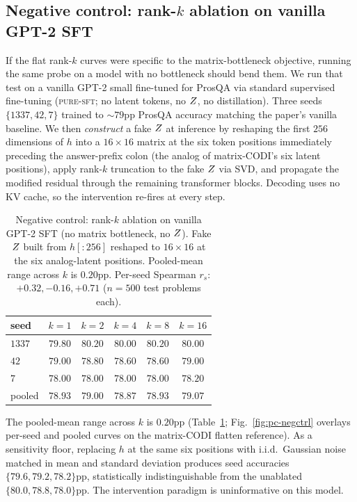 \subsection{Negative control: rank-$k$ ablation on vanilla GPT-2 SFT}
\label{sec:pc-negctrl}

If the flat rank-$k$ curves were specific to the matrix-bottleneck
objective, running the same probe on a model with no bottleneck
should bend them. We run that test on a vanilla GPT-2 small
fine-tuned for ProsQA via standard supervised fine-tuning
(\textsc{pure-sft}; no latent tokens, no $Z$, no distillation).
Three seeds $\{1337, 42, 7\}$ trained to $\sim\!79$pp ProsQA accuracy
matching the paper's vanilla baseline. We then \emph{construct} a
fake $Z$ at inference by reshaping the first $256$ dimensions of
$h$ into a $16\!\times\!16$ matrix at the six token positions
immediately preceding the answer-prefix colon (the analog of
matrix-CODI's six latent positions), apply rank-$k$ truncation to
the fake $Z$ via SVD, and propagate the modified residual through
the remaining transformer blocks. Decoding uses no KV cache, so the
intervention re-fires at every step.

\begin{table}[t]
\caption{Negative control: rank-$k$ ablation on vanilla GPT-2 SFT
(no matrix bottleneck, no $Z$). Fake $Z$ built from
$h[:\!256]$ reshaped to $16\!\times\!16$ at the six analog-latent
positions. Pooled-mean range across $k$ is $0.20$pp. Per-seed
Spearman $r_s$: $+0.32, -0.16, +0.71$ ($n\!=\!500$ test problems
each).}
\label{tab:pc-negctrl}
\centering
\small
\setlength{\tabcolsep}{4pt}
\begin{tabular}{lccccc}
\toprule
seed & $k=1$ & $k=2$ & $k=4$ & $k=8$ & $k=16$ \\
\midrule
$1337$ & $79.80$ & $80.20$ & $80.00$ & $80.20$ & $80.00$ \\
$42$   & $79.00$ & $78.80$ & $78.60$ & $78.60$ & $79.00$ \\
$7$    & $78.00$ & $78.00$ & $78.00$ & $78.00$ & $78.20$ \\
\midrule
pooled & $78.93$ & $79.00$ & $78.87$ & $78.93$ & $79.07$ \\
\bottomrule
\end{tabular}
\end{table}

The pooled-mean range across $k$ is $0.20$pp
(Table~\ref{tab:pc-negctrl}; Fig.~\ref{fig:pc-negctrl} overlays
per-seed and pooled curves on the matrix-CODI flatten reference).
As a sensitivity floor, replacing $h$ at the same six positions with
i.i.d.\ Gaussian noise matched in mean and standard deviation
produces seed accuracies $\{79.6, 79.2, 78.2\}$pp, statistically
indistinguishable from the unablated $\{80.0, 78.8, 78.0\}$pp. The
intervention paradigm is uninformative on this model.

